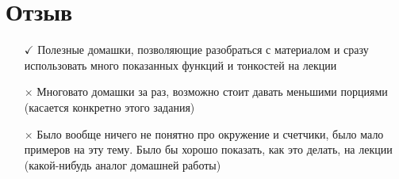 \documentclass{article}
\begin{document}
    \section{Отзыв}
        \begin{itemize}
            \item[$\checkmark$] Полезные домашки, позволяющие разобраться с материалом и сразу использовать много показанных функций и тонкостей на лекции
            \item[$\times$] Многовато домашки за раз, возможно стоит давать меньшими порциями (касается конкретно этого задания)
            \item[$\times$] Было вообще ничего не понятно про окружение и счетчики, было мало примеров на эту тему. Было бы хорошо показать, как это делать, на лекции (какой-нибудь аналог домашней работы)
        \end{itemize}
\end{document}

